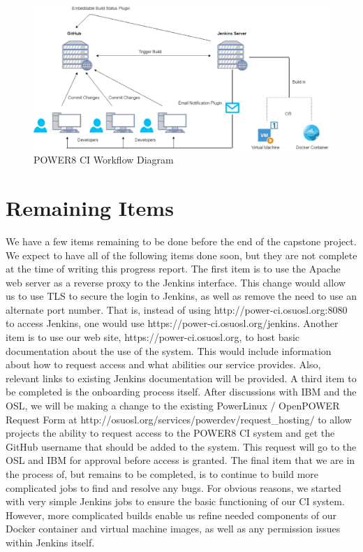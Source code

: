 \documentclass[10pt,onecolumn,journal,draftclsnofoot]{IEEEtran}
\begin{document}
\begin{figure}[H] 
  \includegraphics[width=\textwidth]{images/workflow.eps}
  \caption{POWER8 CI Workflow Diagram}
\end{figure}


\section{Remaining Items}
We have a few items remaining to be done before the end of the capstone project.
We expect to have all of the following items done soon, but they are not complete at the time of writing this progress report.
The first item is to use the Apache web server as a reverse proxy to the Jenkins interface.
This change would allow us to use TLS to secure the login to Jenkins, as well as remove the need to use an alternate port number. 
That is, instead of using http://power-ci.osuosl.org:8080 to access Jenkins, one would use https://power-ci.osuosl.org/jenkins. 
Another item is to use our web site, https://power-ci.osuosl.org, to host basic documentation about the use of the system.
This would include information about how to request access and what abilities our service provides.
Also, relevant links to existing Jenkins documentation will be provided. 
A third item to be completed is the onboarding process itself. 
After discussions with IBM and the OSL, we will be making a change to the existing PowerLinux / OpenPOWER Request Form at http://osuosl.org/services/powerdev/request\_hosting/ to allow projects the ability to request access to the POWER8 CI system and get the GitHub username that should be added to the system. 
This request will go to the OSL and IBM for approval before access is granted.
The final item that we are in the process of, but remains to be completed, is to continue to build more complicated jobs to find and resolve any bugs.
For obvious reasons, we started with very simple Jenkins jobs to ensure the basic functioning of our CI system.
However, more complicated builds enable us refine needed components of our Docker container and virtual machine images, as well as any permission issues within Jenkins itself.
\end{document}
